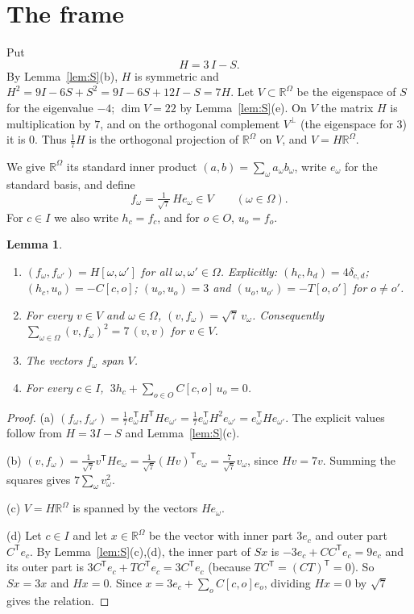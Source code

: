 \documentclass[11pt,a4paper]{article}
\newtheorem{lemma}[theorem]{Lemma}
\theoremstyle{definition}
\theoremstyle{remark}
\newcommand{\RR}{\mathbb{R}}
\newcommand{\tp}{\mathsf{T}}
\newcommand{\Om}{\Omega}
\begin{document}
\section{The frame}\label{sec:frame}

Put
\[
H=3\,I-S .
\]
By Lemma~\ref{lem:S}(b), $H$ is symmetric and $H^2=9I-6S+S^2=9I-6S+12I-S=7H$. Let $V\subset\RR^{\Om}$ be the
eigenspace of $S$ for the eigenvalue $-4$; $\dim V=22$ by Lemma~\ref{lem:S}(e). On $V$ the matrix $H$ is
multiplication by $7$, and on the orthogonal complement $V^\perp$ (the eigenspace for $3$) it is $0$. Thus
$\frac17H$ is the orthogonal projection of $\RR^{\Om}$ on $V$, and $V=H\RR^{\Om}$.

We give $\RR^{\Om}$ its standard inner product $(a,b)=\sum_\omega a_\omega b_\omega$, write $e_\omega$ for the
standard basis, and define
\[
f_\omega=\tfrac1{\sqrt7}\,He_\omega\in V\qquad(\omega\in\Om).
\]
For $c\in I$ we also write $h_c=f_c$, and for $o\in O$, $u_o=f_o$.

\begin{lemma}\label{lem:frame}
\begin{enumerate}[label=\textup{(\alph*)}]
\item $(f_\omega,f_{\omega'})=H[\omega,\omega']$ for all $\omega,\omega'\in\Om$. Explicitly:
$(h_c,h_d)=4\delta_{c,d}$; $(h_c,u_o)=-C[c,o]$; $(u_o,u_o)=3$ and $(u_o,u_{o'})=-T[o,o']$ for $o\ne o'$.
\item For every $v\in V$ and $\omega\in\Om$, $(v,f_\omega)=\sqrt7\,v_\omega$. Consequently
$\sum_{\omega\in\Om}(v,f_\omega)^2=7\,(v,v)$ for $v\in V$.
\item The vectors $f_\omega$ span $V$.
\item For every $c\in I$, $\ 3h_c+\sum_{o\in O}C[c,o]\,u_o=0$.
\end{enumerate}
\end{lemma}
\begin{proof}
(a) $(f_\omega,f_{\omega'})=\frac17e_\omega^{\tp}H^{\tp}He_{\omega'}=\frac17e_\omega^{\tp}H^2e_{\omega'}
=e_\omega^{\tp}He_{\omega'}$. The explicit values follow from $H=3I-S$ and Lemma~\ref{lem:S}(c).

(b) $(v,f_\omega)=\frac1{\sqrt7}v^{\tp}He_\omega=\frac1{\sqrt7}(Hv)^{\tp}e_\omega=\frac7{\sqrt7}v_\omega$, since
$Hv=7v$. Summing the squares gives $7\sum_\omega v_\omega^2$.

(c) $V=H\RR^{\Om}$ is spanned by the vectors $He_\omega$.

(d) Let $c\in I$ and let $x\in\RR^{\Om}$ be the vector with inner part $3e_c$ and outer part $C^{\tp}e_c$. By
Lemma~\ref{lem:S}(c),(d), the inner part of $Sx$ is $-3e_c+CC^{\tp}e_c=9e_c$ and its outer part is
$3C^{\tp}e_c+TC^{\tp}e_c=3C^{\tp}e_c$ (because $TC^{\tp}=(CT)^{\tp}=0$). So $Sx=3x$ and $Hx=0$. Since
$x=3e_c+\sum_oC[c,o]e_o$, dividing $Hx=0$ by $\sqrt7$ gives the relation.
\end{proof}
\end{document}
